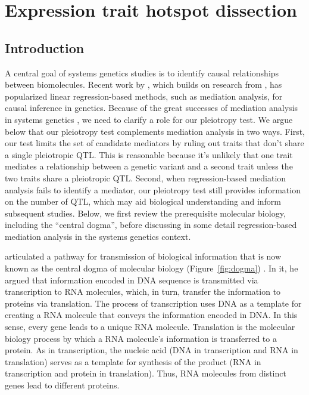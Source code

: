 \documentclass[oneside]{book}\usepackage[]{graphicx}\usepackage[]{color}
\begin{document}
\section{Expression trait hotspot dissection}\label{sec:hotspot-dissection}
\subsection{Introduction}

A central goal of systems genetics studies is to identify causal relationships between biomolecules. 
Recent work by \citet{chick2016defining}, which builds on research from \citet{baron1986moderator}, has popularized linear regression-based methods, such as mediation analysis, for causal inference in genetics. 
Because of the great successes of mediation analysis in systems genetics \citep{chick2016defining,keller2018genetic}, we need to clarify a role for our pleiotropy test. 
We argue below that our pleiotropy test complements mediation analysis in two ways. 
First, our test limits the set of candidate mediators by ruling out traits that don't share a single pleiotropic QTL. 
This is reasonable because it's unlikely that one trait mediates a relationship between a genetic variant and a second trait unless the two traits share a pleiotropic QTL. 
Second, when regression-based mediation analysis fails to identify a mediator, our pleiotropy test still provides information on the number of QTL, which may aid biological understanding and inform subsequent studies. Below, we first review the prerequisite molecular biology, including the ``central dogma'', before discussing in some detail regression-based mediation analysis in the systems genetics context. 

\citet{crick1958protein} articulated a pathway for transmission of biological information that is now known as the central dogma of molecular biology (Figure~\ref{fig:dogma}) \citep{crick1970central}. 
In it, he argued that information encoded in DNA sequence is transmitted via transcription to 
RNA molecules, which, in turn, transfer the information to proteins via translation. 
The process of transcription uses DNA as a template for creating a RNA molecule that conveys the information encoded in DNA. 
In this sense, every gene leads to a unique RNA molecule. 
Translation is the molecular biology process by which a RNA molecule's information is transferred to a protein. 
As in transcription, the nucleic acid (DNA in transcription and RNA in translation) serves as a template for synthesis of the product (RNA in transcription and protein in translation). 
Thus, RNA molecules from distinct genes lead to different proteins.
\end{document}
